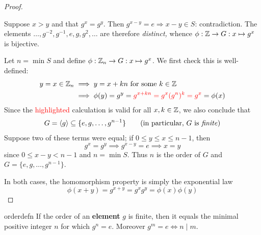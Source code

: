 \begin{proof}
	\begin{description}\itemsep2pt
		\item[\normalfont If $S=\emptyset$:] Suppose $x>y$ and that $g^x=g^y$. Then $g^{x-y}=e\Longrightarrow x-y\in S$: contradiction. The elements $\ldots,g^{-2},g^{-1},e,g,g^2,\ldots$ are therefore \emph{distinct,} whence $\phi:\mathbb{Z}\to G:x\mapsto g^x$ is bijective.
		\item[\normalfont If $S\neq\emptyset$:] Let	$n=\min S$ and define $\phi:\mathbb{Z}_n\to G:x\mapsto g^x$. We first check this is well-defined:
		\begin{align*}
			y=x\in\mathbb{Z}_n&\implies y=x+kn\text{ for some $k\in\mathbb{Z}$}\\
			&\implies \phi(y)=g^y=\textcolor{red}{g^{x+kn}=g^x(g^n)^k=g^x}=\phi(x)
		\end{align*}
		Since the \textcolor{red}{highlighted} calculation is valid for all $x,k\in\mathbb{Z}$, we also conclude that
		\[
			G=\ip{g}\subseteq\{e,g,\ldots,g^{n-1}\} \tag{in particular, $G$ is \emph{finite}}
		\]
		Suppose two of these terms were equal; if $0\le y\le x\le n-1$, then
		\[
			g^x=g^y\implies g^{x-y}=e\implies x=y
		\]
		since $0\le x-y<n-1$ and $n=\min S$. Thus $n$ is the order of $G$ and $G=\{e,g,\ldots,g^{n-1}\}$.
	\end{description}\medskip
	In both cases, the homomorphism property is simply the exponential law
	\[
		\phi(x+y)=g^{x+y}=g^xg^y=\phi(x)\phi(y)\tag*{\qedhere}
	\]
\end{proof}


\begin{cor}{}{orderdefn}
	If the order of an \textbf{element} $g$ is finite, then it equals the minimal positive integer $n$ for which $g^n=e$. Moreover $g^m=e\Longleftrightarrow n\mid m$.
\end{cor}


\goodbreak

